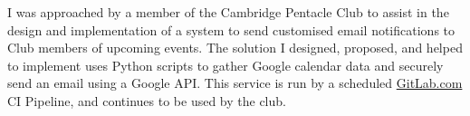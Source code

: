 \descript{ }
\vspace*{-\topsep}  %
\begin{justify}
I was approached by a member of the Cambridge Pentacle Club to assist in the design and implementation of a system to send customised email notifications to Club members of upcoming events.
The solution I designed, proposed, and helped to implement uses Python scripts to gather Google calendar data and securely send an email using a Google API.
This service is run by a scheduled \href{https://gitlab.com/}{GitLab.com} CI Pipeline, and continues to be used by the club.
\end{justify}